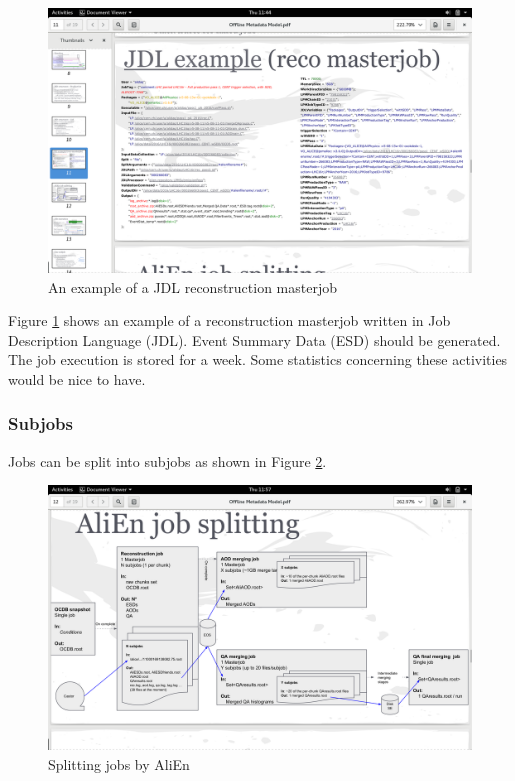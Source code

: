 \begin{figure}[h]
  \begin{center}
    \includegraphics[scale=0.15]{./images/jdl_example.png}
    \caption{An example of a JDL reconstruction masterjob}
    \label{fig:jdl_example}
  \end{center}
\end{figure}
Figure \ref{fig:jdl_example} shows an example of a reconstruction masterjob written in Job Description Language (JDL). Event Summary Data (ESD) should be generated. The job execution is stored for a week. Some statistics concerning these activities would be nice to have.

\subsubsection{Subjobs}
Jobs can be split into subjobs as shown in Figure \ref{fig:splitting_subjobs}.

\begin{figure}[h]
  \begin{center}
    \includegraphics[scale=0.15]{./images/splitting_subjobs}
    \caption{Splitting jobs by AliEn}
    \label{fig:splitting_subjobs}
  \end{center}
\end{figure}

